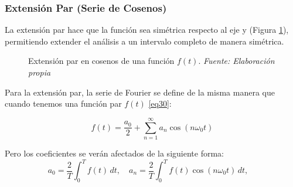 \subsubsection{Extensión Par (Serie de Cosenos)}
La extensión par hace que la función sea simétrica respecto al eje y (Figura \ref{fig:serie-de-cosenos}), permitiendo extender el análisis a un intervalo completo de manera simétrica.
\begin{figure}[H]
		\caption[Extensión par en cosenos de una función $f(t)$]{Extensión par en cosenos de una función $f(t)$. \textit{Fuente: Elaboración propia}}
		\label{fig:serie-de-cosenos} 
\end{figure}
Para la extensión par, la serie de Fourier se define de la misma manera que cuando tenemos una función par $f(t)$ \eqref{eq30}:

\begin{equation}\label{eq32}
	f(t) = \frac{a_0}{2} + \sum_{n=1}^{\infty} a_n \cos(n\omega_0 t)
\end{equation}

Pero los coeficientes se verán afectados de la siguiente forma: ~\cite{fourierCruzFierro}
\begin{equation}\label{eq33}
	a_0 = \frac{2}{T} \int_{0}^{T} f(t) \, dt, \quad a_n = \frac{2}{T} \int_{0}^{T} f(t) \cos(n\omega_0 t) \, dt, \quad 
\end{equation}

